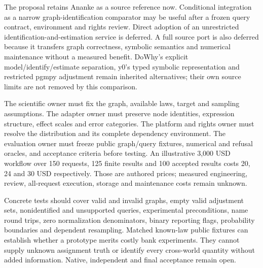 The proposal retains Ananke as a source reference now. Conditional integration
as a narrow graph-identification comparator may be useful after a frozen
query contract, environment and rights review. Direct adoption of an
unrestricted identification-and-estimation service is deferred. A full
source port is also deferred because it transfers graph correctness,
symbolic semantics and numerical maintenance without a measured benefit.
DoWhy's explicit model/identify/estimate separation, y0's typed symbolic
representation and restricted pgmpy adjustment remain inherited alternatives;
their own source limits are not removed by this comparison.
\citep{exec24_ananke_choice}

The scientific owner must fix the graph, available laws, target and
sampling assumptions. The adapter owner must preserve node identities,
expression structure, effect scales and error categories. The platform
and rights owner must resolve the distribution and its complete dependency
environment. The evaluation owner must freeze public graph/query fixtures,
numerical and refusal oracles, and acceptance criteria before testing.
An illustrative 3,000 USD workflow over 150 requests, 125 finite results
and 100 accepted results costs 20, 24 and 30 USD respectively. Those are
authored prices; measured engineering, review, all-request execution,
storage and maintenance costs remain unknown.
\citep{exec24_ananke_choice}

Concrete tests should cover valid and invalid graphs, empty valid adjustment
sets, nonidentified and unsupported queries, experimental preconditions,
name round trips, zero normalization denominators, binary reporting flags,
probability boundaries and dependent resampling. Matched known-law public
fixtures can establish whether a prototype merits costly bank experiments.
They cannot supply unknown assignment truth or identify every cross-world
quantity without added information. Native, independent and final
acceptance remain open.\citep{exec24_ananke_choice}
